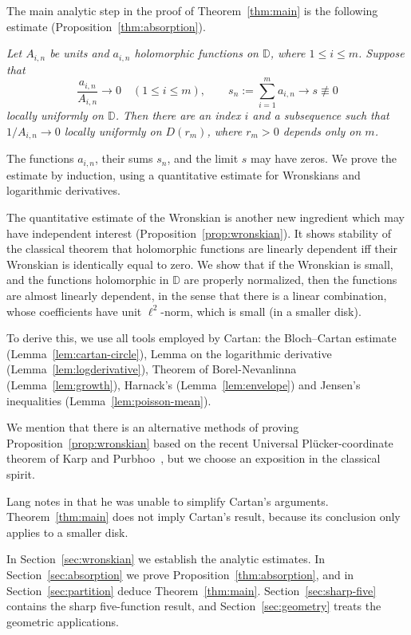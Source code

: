 \documentclass[12pt,letterpaper,reqno]{amsart}
\theoremstyle{definition}
\numberwithin{equation}{section}
\newcommand{\D}{\mathbb D}
\begin{document}
	The main analytic step in the proof of Theorem~\ref{thm:main} is the following estimate
	(Proposition~\ref{thm:absorption}).
	\vspace{.1in}

	{\em Let $A_{i,n}$ be units and $a_{i,n}$ holomorphic functions on
		$\D$, where $1\le i\le m$. Suppose that
		\[
		\frac{a_{i,n}}{A_{i,n}}\longrightarrow0\quad(1\le i\le m),
		\qquad s_n:=\sum_{i=1}^m a_{i,n}\longrightarrow s\not\equiv0
		\]
		locally uniformly on $\D$. Then there are an index $i$ and a
		subsequence such that $1/A_{i,n}\longrightarrow0$ locally uniformly on $D(r_m)$,
		where $r_m>0$ depends only on $m$.}
	\vspace{.1in}

	The functions $a_{i,n}$, their sums $s_n$, and the limit $s$
	may have zeros. We prove the estimate by induction, using a
	quantitative estimate for Wronskians and logarithmic derivatives.
	
	The quantitative estimate of the Wronskian is another new ingredient which
	may have independent interest
	(Proposition~\ref{prop:wronskian}).
	It shows stability of the classical
	theorem that holomorphic functions are linearly dependent iff their Wronskian
	is identically equal to zero.
	We show that if the Wronskian is small, and the functions holomorphic
	in $\D$ are properly
	normalized, then the functions are almost linearly dependent,
	in the sense that there is a linear combination, whose coefficients
	have unit $\ell^2$-norm, which is small (in a smaller disk).
	
	To derive this, we use all tools employed by Cartan:
	the Bloch--Cartan estimate
	(Lemma~\ref{lem:cartan-circle}), Lemma on the logarithmic derivative
	(Lemma~\ref{lem:logderivative}), Theorem of Borel-Nevanlinna
	(Lemma~\ref{lem:growth}),
	Harnack's (Lemma~\ref{lem:envelope})
	and Jensen's inequalities (Lemma~\ref{lem:poisson-mean}).
	
We mention that there is an alternative methods
of proving Proposition~\ref{prop:wronskian}
based on the recent Universal
Pl\"ucker-coordinate theorem of Karp and Purbhoo~\cite{KP26}, but we choose
an exposition in the classical spirit.
	
	Lang notes in \cite[Chapter~VIII, p.~225]{Lan87} that he was unable
	to simplify Cartan's arguments. Theorem~\ref{thm:main} does not imply
	Cartan's result, because its conclusion only applies to a smaller disk.
	
In Section~\ref{sec:wronskian} we establish the analytic estimates.
	In Section~\ref{sec:absorption} we prove Proposition~\ref{thm:absorption}, and
	in Section~\ref{sec:partition} deduce Theorem~\ref{thm:main}.
	Section~\ref{sec:sharp-five} contains the sharp five-function result, and
	Section~\ref{sec:geometry} treats the geometric applications.
	
\end{document}
